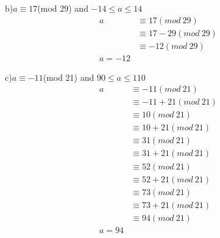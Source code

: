 \documentclass[12pt]{article}
\begin{document}
b)$a\equiv 17$(mod 29) and $-14\leq a\leq 14$\\
\begin{equation}\nonumber
    \begin{split}
       a&\equiv 17(mod~29)\\
       &\equiv 17-29(mod~29)\\
       &\equiv -12(mod~29)\\
       a=-12
    \end{split}
\end{equation}

c)$a\equiv -11$(mod 21) and $90\leq a\leq 110$\\
\begin{equation}\nonumber
    \begin{split}
       a&\equiv -11(mod~21)\\
       &\equiv -11+21(mod~21)\\
       &\equiv 10(mod~21)\\
       &\equiv 10+21(mod~21)\\
       &\equiv 31(mod~21)\\
       &\equiv 31+21(mod~21)\\
       &\equiv 52(mod~21)\\
       &\equiv 52+21(mod~21)\\
       &\equiv 73(mod~21)\\
       &\equiv 73+21(mod~21)\\
       &\equiv 94(mod~21)\\
       a=94
    \end{split}
\end{equation}
\end{document}
